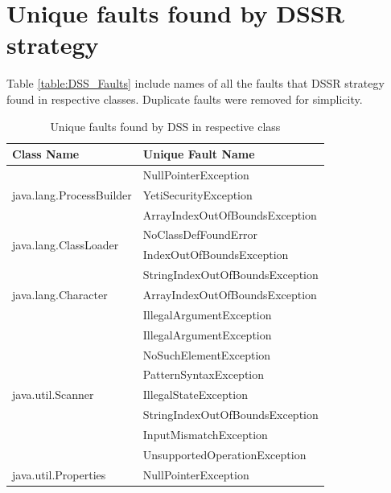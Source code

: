\documentclass[10pt, conference, compsocconf]{IEEEtran}
\begin{document}
\newpage

\section{Unique faults found by DSSR strategy}
Table \ref{table:DSS_Faults} include names of all the faults that DSSR strategy found in respective classes. Duplicate faults were removed for simplicity.

\begin{table}[ht]
\caption{Unique faults found by DSS in respective class} %
\centering %
\begin{tabular}{| l | l |} %
\hline\hline %
Class Name & Unique Fault Name \\ [0.5ex] %
\hline %
\multirow{3}{*}{java.lang.ProcessBuilder} & NullPointerException\\ %
& YetiSecurityException\\ %
& ArrayIndexOutOfBoundsException\\ %
\hline
\multirow{2}{*}{java.lang.ClassLoader} & NoClassDefFoundError\\ %
& IndexOutOfBoundsException\\ %
\hline
\multirow{3}{*}{java.lang.Character} & StringIndexOutOfBoundsException\\ %
& ArrayIndexOutOfBoundsException\\ %
& IllegalArgumentException\\ %
\hline
\multirow{7}{*}{java.util.Scanner} & IllegalArgumentException\\ %
& NoSuchElementException\\ %
& PatternSyntaxException\\ %
& IllegalStateException\\ %
& StringIndexOutOfBoundsException\\ %
& InputMismatchException\\ %
& UnsupportedOperationException\\ %
\hline
\multirow{2}{*}{java.util.Properties} & NullPointerException\\ %

\end{tabular}
\end{table}
\end{document}
